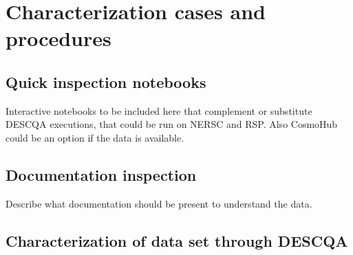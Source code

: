\documentclass[12pt, a4paper]{article}
\begin{document}
\section{Characterization cases and procedures}

\subsection{Quick inspection notebooks}
Interactive notebooks to be included here that complement or substitute DESCQA executions, that could be run on NERSC and RSP. Also CosmoHub could be an option if the data is available.

\subsection{Documentation inspection}
Describe what documentation should be present to understand the data.

\subsection{Characterization of data set through DESCQA}









\end{document}
